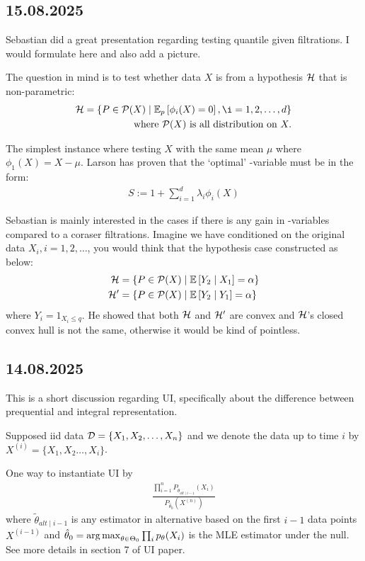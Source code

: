 \subsection*{15.08.2025} Sebastian did a great presentation regarding testing
quantile given filtrations. I would formulate here and also add a picture.

The question in mind is to test whether data $X$ is from a hypothesis $\mathcal{H}$ that
is non-parametric:
\begin{align*}
	\Hc = \left\{P \in \Pc(X) \mid \ERWi{p}{\phi_i(X)=0}, \i=1,2,\dots,d\right\} \\
	\text{where } \Pc(X) \text{ is all distribution on } X.
\end{align*}

The simplest instance where testing $X$ with the same mean $\mu$ where
$\phi_1(X)=X-\mu$.
Larson has proven that the `optimal' \E-variable must be in the form:
\begin{align*}
	S := 1 +\sum_{i=1}^d \lambda_i \phi_i(X)
\end{align*}

Sebastian is mainly interested in the cases if there is any gain in \E-variables
compared to a coraser filtrations.
Imagine we have conditioned on the original data $X_i, i=1,2,\dots$, you would think
that the hypothesis case constructed as below:
\begin{align}
	\Hc  & = \left\{P \in \Pc(X) \mid \condERW{Y_2}{X_1} = \alpha \right\} \\
	\Hc' & = \left\{P \in \Pc(X) \mid \condERW{Y_2}{Y_1} = \alpha \right\}
\end{align}
where $Y_i = 1_{X_i \leq q}$. He showed that both $\mathcal{H}$ and $\mathcal{H}'$ are convex
and $\mathcal{H}$'s closed convex hull is not the same, otherwise it would be kind of pointless.


\subsection*{14.08.2025}

This is a short discussion regarding UI, specifically about the difference
between prequential and integral representation.

Supposed iid data $\mathcal{D}=\{X_1,X_2,\dots,X_n\}$ and we denote
the data up to time $i$ by $X^{(i)}=\{X_1,X_2\dots,X_i\}$.

One way to instantiate UI by
\begin{align*}
	\frac{\prod_{i=1}^n P_{\tilde{\theta}_{alt\mid i-1}}(X_i)}{P_{\hat{\theta}_0}(X^{(n)})}
\end{align*}
where $\tilde{\theta}_{alt\mid i-1}$ is any estimator in alternative based on
the first $i-1$ data points $X^{(i-1)}$
and $\hat{\theta}_0=\operatorname*{arg\, max}_{\theta\in\Theta_0} \prod_i p_{\theta}(X_i)$
is the MLE estimator under the null.
See more details in section 7 of UI paper.

